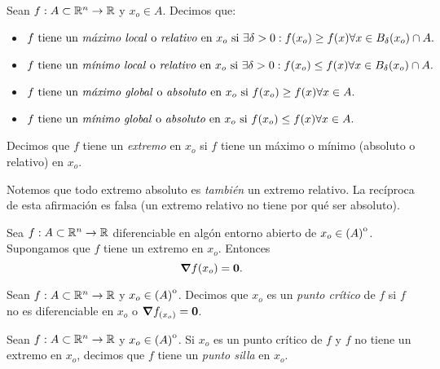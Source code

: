 \label{sec:extremos}

\begin{definition}  \label{def:extremos}
 \mbox{}
 
 Sean $f: A \subset \mathbb{R}^n \to \mathbb{R}$ y $x_o \in A$. Decimos que:
 \begin{itemize}
  \item $f \text{ tiene un \emph{m\'aximo local} o \emph{relativo} en } x_o \text{ si } \exists \delta > 0 : f(x_o) \ge f(x) \forall x \in B_{\delta}(x_o) \cap A.$ 
  \item $f \text{ tiene un \emph{m\'inimo local} o \emph{relativo} en } x_o \text{ si } \exists \delta > 0 : f(x_o) \le f(x) \forall x \in B_{\delta}(x_o) \cap A.$
  \item $f \text{ tiene un \emph{m\'aximo global} o \emph{absoluto} en } x_o \text{ si } f(x_o) \ge f(x) \forall x \in A.$ 
  \item $f \text{ tiene un \emph{m\'inimo global} o \emph{absoluto} en } x_o \text{ si } f(x_o) \le f(x) \forall x \in A.$
 \end{itemize}
 Decimos que $f$ tiene un \emph{extremo} en $x_o$ si $f$ tiene un m\'aximo o m\'inimo (absoluto o relativo) en $x_o$.
 \begin{obs}
  Notemos que todo extremo absoluto es \emph{tambi\'en} un extremo relativo. La rec\'iproca de esta afirmaci\'on es falsa (un extremo relativo no tiene por qu\'e ser absoluto).
 \end{obs}
\end{definition}

\begin{theorem} \label{teo:grad_nulo}
 Sea $f: A \subset \mathbb{R}^n \to \mathbb{R}$ diferenciable en alg\'on entorno abierto de $x_o \in {\kern0pt(A)}^{\mathrm{o}}$. Supongamos que $f$ tiene un extremo en $x_o$. Entonces
 \[
  \grad f(x_o) = \mathbf{0}.
 \]
\end{theorem}

\begin{definition}  \label{def:pto_crit}
 Sean $f: A \subset \mathbb{R}^n \to \mathbb{R}$ y $x_o \in {\kern0pt(A)}^{\mathrm{o}}$. Decimos que $x_o$ es un \emph{punto cr\'itico} de $f$ si $f$ no es diferenciable en $x_o$ o $\grad f_{(x_o)} = \mathbf{0}$.
\end{definition}

\begin{definition}  \label{def:pto_silla}
 Sean $f: A \subset \mathbb{R}^n \to \mathbb{R}$ y $x_o \in {\kern0pt(A)}^{\mathrm{o}}$. Si $x_o$ es un punto cr\'itico de $f$ y $f$ no tiene un extremo en $x_o$, decimos que $f$ tiene un \emph{punto silla} en $x_o$.
\end{definition}


